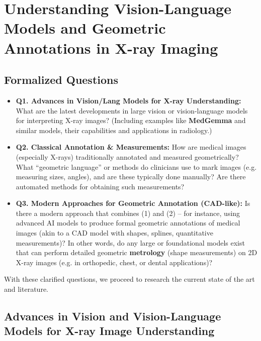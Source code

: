 \documentclass[
]{article}
\author{}
\date{}
\providecommand{\tightlist}{%
  \setlength{\itemsep}{0pt}\setlength{\parskip}{0pt}}
\begin{document}
\section{Understanding Vision-Language Models and Geometric Annotations
in X-ray
Imaging}\label{understanding-vision-language-models-and-geometric-annotations-in-x-ray-imaging}

\subsection{Formalized Questions}\label{formalized-questions}

\begin{itemize}
\tightlist
\item
  \textbf{Q1. Advances in Vision/Lang Models for X-ray Understanding:}
  What are the latest developments in large vision or vision-language
  models for interpreting X-ray images? (Including examples like
  \textbf{MedGemma} and similar models, their capabilities and
  applications in radiology.)
\item
  \textbf{Q2. Classical Annotation \& Measurements:} How are medical
  images (especially X-rays) traditionally annotated and measured
  geometrically? What ``geometric language'' or methods do clinicians
  use to mark images (e.g. measuring sizes, angles), and are these
  typically done manually? Are there automated methods for obtaining
  such measurements?
\item
  \textbf{Q3. Modern Approaches for Geometric Annotation (CAD-like):} Is
  there a modern approach that combines (1) and (2) -- for instance,
  using advanced AI models to produce formal geometric annotations of
  medical images (akin to a CAD model with shapes, splines, quantitative
  measurements)? In other words, do any large or foundational models
  exist that can perform detailed geometric \textbf{metrology} (shape
  measurements) on 2D X-ray images (e.g. in orthopedic, chest, or dental
  applications)?
\end{itemize}

With these clarified questions, we proceed to research the current state
of the art and literature.

\subsection{Advances in Vision and Vision-Language Models for X-ray
Image
Understanding}\label{advances-in-vision-and-vision-language-models-for-x-ray-image-understanding}
\end{document}
